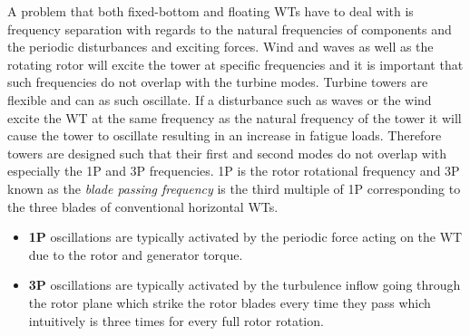 A problem that both fixed-bottom and floating WTs have to deal with is frequency separation with regards to the natural frequencies of components and the periodic disturbances and exciting forces. Wind and waves as well as the rotating rotor will excite the tower at specific frequencies and it is important that such frequencies do not overlap with the turbine modes. Turbine towers are flexible and can as such oscillate. If a disturbance such as waves or the wind excite the WT at the same frequency as the natural frequency of the tower it will cause the tower to oscillate resulting in an increase in fatigue loads. Therefore towers are designed such that their first and second modes do not overlap with especially the 1P and 3P frequencies. 1P is the rotor rotational frequency and 3P known as the \textit{blade passing frequency} is the third multiple of 1P corresponding to the three blades of conventional horizontal WTs.
\begin{itemize}
	\item \textbf{1P} oscillations are typically activated by the periodic force acting on the WT due to the rotor and generator torque.
	\item \textbf{3P} oscillations are typically activated by the turbulence inflow going through the rotor plane which strike the rotor blades every time they pass which intuitively is three times for every full rotor rotation.
\end{itemize}

